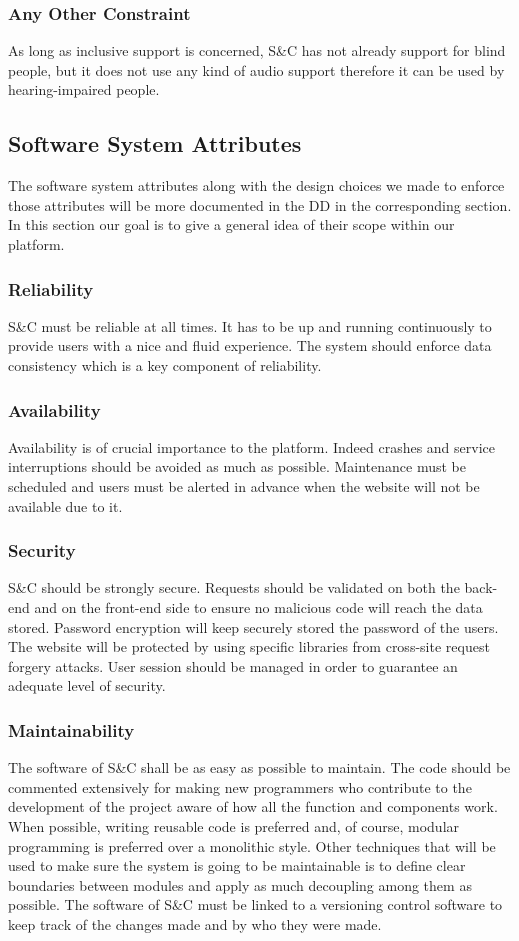 \subsubsection{Any Other Constraint}
As long as inclusive support is concerned, S\&C has not already support for blind people, but it does not use any kind of audio support therefore it can be used by hearing-impaired people.

\subsection{Software System Attributes}
The software system attributes along with the design choices we made to enforce those attributes will be more documented in the DD in the corresponding section. In this section our goal is to give a general idea of their scope within our platform.

\subsubsection{Reliability}
S\&C must be reliable at all times. It has to be up and running continuously to provide users with a nice and fluid experience. The system should enforce data consistency which is a key component of reliability. 

\subsubsection{Availability}
Availability is of crucial importance to the platform. Indeed crashes and service interruptions should be avoided as much as possible. Maintenance must be scheduled and users must be alerted in advance when the website will not be available due to it.

\subsubsection{Security}
S\&C should be strongly secure. Requests should be validated on both the back-end and on the front-end side to ensure no malicious code will reach the data stored. Password encryption will keep securely stored the password of the users. The website will be protected by using specific libraries from cross-site request forgery attacks. User session should be managed in order to guarantee an adequate level of security.

\subsubsection{Maintainability}
The software of S\&C shall be as easy as possible to maintain. The code should be commented extensively for making new programmers who contribute to the development of the project aware of how all the function and components work. When possible, writing reusable code is preferred and, of course, modular programming is preferred over a monolithic style. Other techniques that will be used to make sure the system is going to be maintainable is to define clear boundaries between modules and apply as much decoupling among them as possible. The software of S\&C must be linked to a versioning control software to keep track of the changes made and by who they were made.

